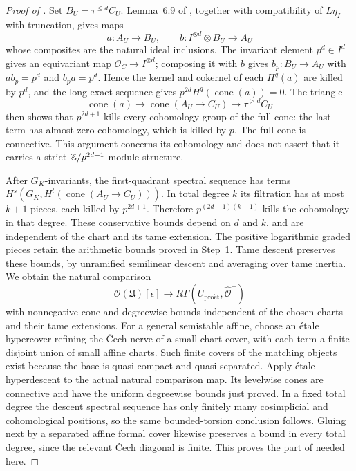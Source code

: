 \begin{proof}[Proof of ]
Set $B_U=\tau^{\leq d}C_U$.  Lemma~6.9 of \cite{BMS}, together
with compatibility of $L\eta_I$ with truncation, gives maps
\[
 a:A_U\longrightarrow B_U,
 \qquad b:I^{\otimes d}\otimes B_U\longrightarrow A_U
\]
whose composites are the natural ideal inclusions.  The invariant
element $p^d\in I^d$ gives an equivariant map
$\mathcal O_C\to I^{\otimes d}$; composing it with $b$ gives
$b_p:B_U\to A_U$ with $ab_p=p^d$ and $b_pa=p^d$.
Hence the kernel and cokernel of each $H^q(a)$ are killed by $p^d$,
and the long exact sequence gives
$p^{2d}H^q(\operatorname{cone}(a))=0$.
The triangle
\[
 \operatorname{cone}(a)\longrightarrow
 \operatorname{cone}(A_U\to C_U)\longrightarrow
 \tau^{>d}C_U
\]
then shows that $p^{2d+1}$ kills every cohomology group of the full
cone: the last term has almost-zero cohomology, which is killed by $p$.
The full cone is connective.  This argument concerns its cohomology
and does not assert that it carries a strict
$\mathbb Z/p^{2d+1}$-module structure.

After $G_K$-invariants, the first-quadrant spectral sequence has
terms $H^s(G_K,H^t(\operatorname{cone}(A_U\to C_U)))$.
In total degree $k$ its filtration has at most $k+1$ pieces, each
killed by $p^{2d+1}$.  Therefore $p^{(2d+1)(k+1)}$ kills the
cohomology in that degree.  These conservative bounds depend on
$d$ and $k$, and are independent of the chart and its tame extension.
The positive logarithmic graded pieces retain the arithmetic
bounds proved in Step~1. Tame descent preserves these bounds, by
unramified semilinear descent and averaging over tame inertia.
We obtain the natural comparison
\[
 \mathcal O(\mathfrak U)[\epsilon]\longrightarrow
 R\Gamma(U_{\mathrm{pro\acute et}},\widehat{\mathcal O}^{+})
\]
with nonnegative cone and degreewise bounds independent of the
chosen charts and their tame extensions. For a general semistable
affine, choose an \'etale hypercover refining the \v Cech nerve of
a small-chart cover, with each term a finite disjoint union of
small affine charts. Such finite covers of the matching objects
exist because the base is quasi-compact and quasi-separated.
Apply \'etale hyperdescent to the actual natural comparison map.
Its levelwise cones are connective and have the uniform degreewise
bounds just proved. In a fixed total degree the descent spectral
sequence has only finitely many cosimplicial and cohomological
positions, so the same bounded-torsion conclusion follows. Gluing next
by a separated affine formal cover likewise preserves a bound in
every total degree, since the relevant \v Cech diagonal is finite.  This proves the part of
\cite[Sections~5.3--5.6]{BSSW} needed here.


\end{proof}
